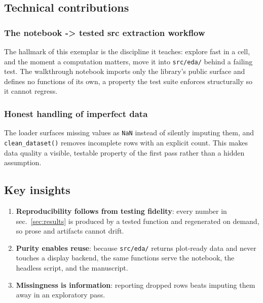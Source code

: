\documentclass[
]{article}
\providecommand{\tightlist}{%
  \setlength{\itemsep}{0pt}\setlength{\parskip}{0pt}}
\begin{document}
\subsection{Technical contributions}\label{technical-contributions}

\subsubsection{The notebook -\textgreater{} tested src extraction
workflow}\label{the-notebook---tested-src-extraction-workflow-1}

The hallmark of this exemplar is the discipline it teaches: explore fast
in a cell, and the moment a computation matters, move it into
\texttt{src/eda/} behind a failing test. The walkthrough notebook
imports only the library's public surface and defines no functions of
its own, a property the test suite enforces structurally so it cannot
regress.

\subsubsection{Honest handling of imperfect
data}\label{honest-handling-of-imperfect-data}

The loader surfaces missing values as \texttt{NaN} instead of silently
imputing them, and \texttt{clean\_dataset()} removes incomplete rows
with an explicit count. This makes data quality a visible, testable
property of the first pass rather than a hidden assumption.

\subsection{Key insights}\label{key-insights}

\begin{enumerate}
\def\labelenumi{\arabic{enumi}.}
\tightlist
\item
  \textbf{Reproducibility follows from testing fidelity}: every number
  in sec.~\ref{sec:results} is produced by a tested function and
  regenerated on demand, so prose and artifacts cannot drift.
\item
  \textbf{Purity enables reuse}: because \texttt{src/eda/} returns
  plot-ready data and never touches a display backend, the same
  functions serve the notebook, the headless script, and the manuscript.
\item
  \textbf{Missingness is information}: reporting dropped rows beats
  imputing them away in an exploratory pass.
\end{enumerate}
\end{document}
